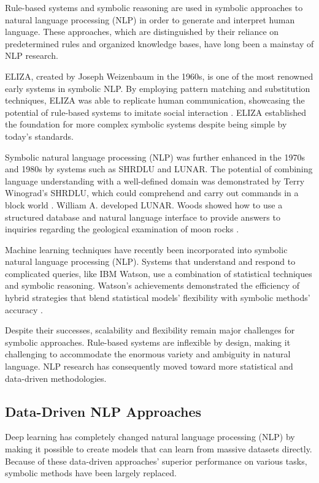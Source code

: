 Rule-based systems and symbolic reasoning are used in symbolic approaches to natural language processing (NLP) in order to generate and interpret human language. These approaches, which are distinguished by their reliance on predetermined rules and organized knowledge bases, have long been a mainstay of NLP research. 

ELIZA, created by Joseph Weizenbaum in the 1960s, is one of the most renowned early systems in symbolic NLP. By employing pattern matching and substitution techniques, ELIZA was able to replicate human communication, showcasing the potential of rule-based systems to imitate social interaction \cite{weizenbaum1966eliza}. ELIZA established the foundation for more complex symbolic systems despite being simple by today's standards.

Symbolic natural language processing (NLP) was further enhanced in the 1970s and 1980s by systems such as SHRDLU and LUNAR. The potential of combining language understanding with a well-defined domain was demonstrated by Terry Winograd's SHRDLU, which could comprehend and carry out commands in a block world \cite{winograd1971procedures}. William A. developed LUNAR. Woods showed how to use a structured database and natural language interface to provide answers to inquiries regarding the geological examination of moon rocks \cite{woods1973progress}.

Machine learning techniques have recently been incorporated into symbolic natural language processing (NLP). Systems that understand and respond to complicated queries, like IBM Watson, use a combination of statistical techniques and symbolic reasoning. Watson's achievements demonstrated the efficiency of hybrid strategies that blend statistical models' flexibility with symbolic methods' accuracy \cite{ferrucci2010building}.

Despite their successes, scalability and flexibility remain major challenges for symbolic approaches. Rule-based systems are inflexible by design, making it challenging to accommodate the enormous variety and ambiguity in natural language. NLP research has consequently moved toward more statistical and data-driven methodologies.

\subsection{Data-Driven NLP Approaches}

Deep learning has completely changed natural language processing (NLP) by making it possible to create models that can learn from massive datasets directly. Because of these data-driven approaches' superior performance on various tasks, symbolic methods have been largely replaced. 


